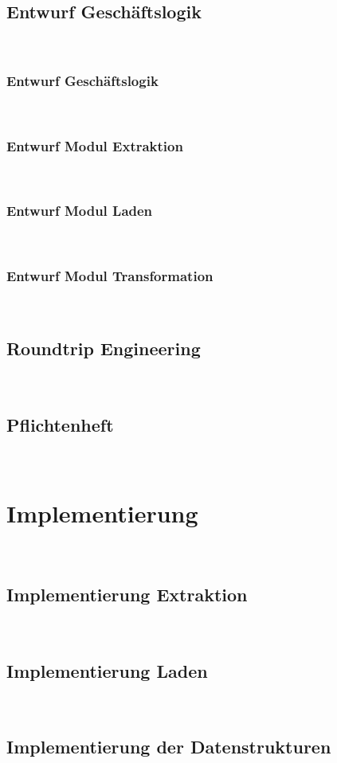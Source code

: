 \documentclass[11pt,toc=sectionentrywithoutdots, 
headheight=44pt, headings=optiontoheadandtoc, hyperfootnotes=false, hypertexnames=false]{scrartcl}
\begin{document}
\subsection{Entwurf Geschäftslogik}
\blindtext\

\subsubsection{Entwurf Geschäftslogik}
\blindtext\

\subsubsection{Entwurf Modul Extraktion}
\blindtext\

\subsubsection{Entwurf Modul Laden}
\blindtext\

\subsubsection{Entwurf Modul Transformation}
\blindtext\

\subsection{Roundtrip Engineering}
\blindtext\

\subsection{Pflichtenheft}
\blindtext\

\section{Implementierung}
\blindtext\

\subsection{Implementierung Extraktion}
\blindtext\

\subsection{Implementierung Laden}
\blindtext\

\subsection{Implementierung der Datenstrukturen}
\blindtext\
\end{document}

